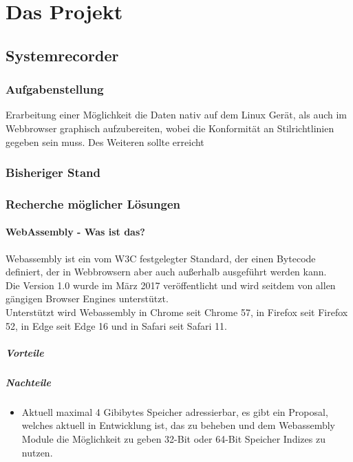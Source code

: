 \chapter{Das Projekt}

\section{Systemrecorder}
\subsection{Aufgabenstellung}
Erarbeitung einer Möglichkeit die Daten nativ auf dem Linux Gerät, als auch im Webbrowser graphisch aufzubereiten, wobei die Konformität an Stilrichtlinien gegeben sein muss.
Des Weiteren sollte erreicht 
\subsection{Bisheriger Stand}
\subsection{Recherche möglicher Lösungen}
\subsubsection{WebAssembly - Was ist das?}
Webassembly ist ein vom W3C festgelegter Standard, der einen Bytecode definiert, der in Webbrowsern aber auch außerhalb ausgeführt werden kann. \\
Die Version 1.0 wurde im März 2017 veröffentlicht und wird seitdem von allen gängigen Browser Engines unterstützt. \\
Unterstützt wird Webassembly in Chrome seit Chrome 57, in Firefox seit Firefox 52, in Edge seit Edge 16 und in Safari seit Safari 11. \\
\paragraph*{Vorteile}

\paragraph*{Nachteile}
\begin{itemize}
    \item   Aktuell maximal 4 Gibibytes Speicher adressierbar, es gibt ein Proposal, welches aktuell in Entwicklung ist, das zu beheben und dem
            Webassembly Module die Möglichkeit zu geben 32-Bit oder 64-Bit Speicher Indizes zu nutzen.
\end{itemize}
